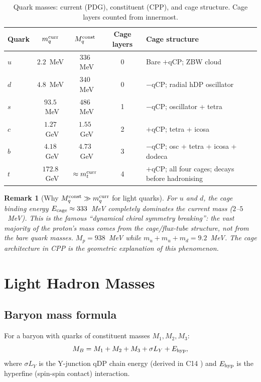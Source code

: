 \documentclass[11pt,a4paper]{article}
\newtheorem{remark}[theorem]{Remark}
\begin{document}
\begin{table}[H]
\centering
\caption{Quark masses: current (PDG), constituent (CPP), and cage
  structure.  Cage layers counted from innermost.}
\label{tab:quarkmasses}
\begin{tabular}{@{}lcccp{4.5cm}@{}}
\toprule
Quark & $m_q^{\rm curr}$ & $M_q^{\rm const}$ & Cage layers & Cage structure \\
\midrule
$u$ & $2.2$~MeV & $336$~MeV & 0 & Bare $+$qCP; ZBW cloud \\
$d$ & $4.8$~MeV & $340$~MeV & 0 & $-$qCP; radial hDP oscillator \\
$s$ & $93.5$~MeV & $486$~MeV & 1 & $-$qCP; oscillator + tetra \\
$c$ & $1.27$~GeV & $1.55$~GeV & 2 & $+$qCP; tetra + icosa \\
$b$ & $4.18$~GeV & $4.73$~GeV & 3 & $-$qCP; osc + tetra + icosa + dodeca \\
$t$ & $172.8$~GeV & $\approx m_t^{\rm curr}$ & 4 & $+$qCP; all four cages;
  decays before hadronising \\
\bottomrule
\end{tabular}
\end{table}

\begin{remark}[Why $M_q^{\rm const} \gg m_q^{\rm curr}$ for light quarks]
For $u$ and $d$, the cage binding energy $E_{\rm cage} \approx 333$~MeV
completely dominates the current mass ($2$--$5$~MeV).  This is the
famous ``dynamical chiral symmetry breaking'': the vast majority
of the proton's mass comes from the cage/flux-tube structure, not
from the bare quark masses.  $M_p = 938$~MeV while
$m_u + m_u + m_d = 9.2$~MeV.  The cage architecture in CPP is the
geometric explanation of this phenomenon.
\end{remark}

\section{Light Hadron Masses}
\label{sec:lighthadrons}

\subsection{Baryon mass formula}

For a baryon with quarks of constituent masses $M_1, M_2, M_3$:
\begin{equation}
M_B = M_1 + M_2 + M_3 + \sigma L_Y + E_{\rm hyp},
\label{eq:baryon_mass}
\end{equation}
where $\sigma L_Y$ is the Y-junction qDP chain energy (derived in
C14 \citep{c14}) and $E_{\rm hyp}$ is the hyperfine (spin-spin
contact) interaction.
\end{document}
